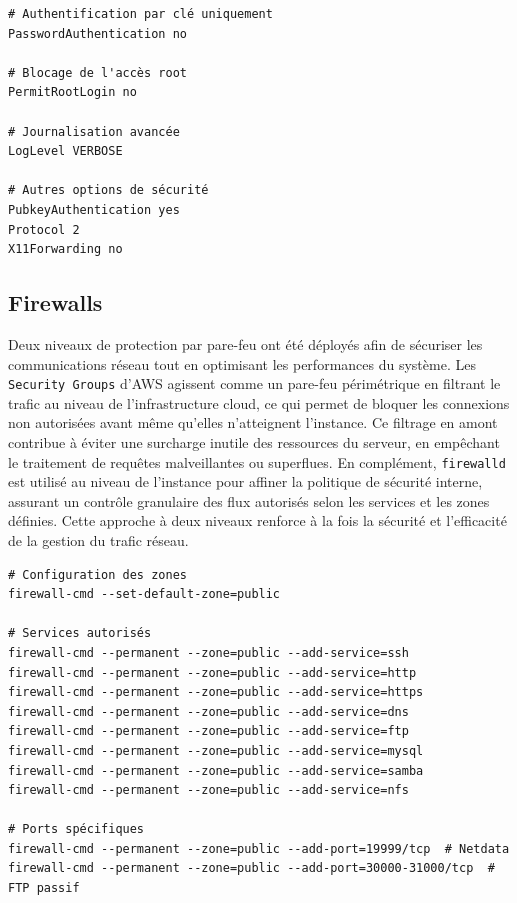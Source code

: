 \documentclass[a4paper,12pt]{article}
\begin{document}
\begin{lstlisting}[caption={Configuration SSH – /etc/ssh/sshd\textunderscore config}]
# Authentification par clé uniquement
PasswordAuthentication no

# Blocage de l'accès root
PermitRootLogin no

# Journalisation avancée
LogLevel VERBOSE

# Autres options de sécurité
PubkeyAuthentication yes
Protocol 2
X11Forwarding no
\end{lstlisting}

\subsection{Firewalls}

Deux niveaux de protection par pare-feu ont été déployés afin de sécuriser les communications réseau tout en optimisant les performances du système. Les  \texttt{Security Groups} d'AWS agissent comme un pare-feu périmétrique en filtrant le trafic au niveau de l'infrastructure cloud, ce qui permet de bloquer les connexions non autorisées avant même qu'elles n'atteignent l'instance. Ce filtrage en amont contribue à éviter une surcharge inutile des ressources du serveur, en empêchant le traitement de requêtes malveillantes ou superflues. En complément,  \texttt{firewalld} est utilisé au niveau de l'instance pour affiner la politique de sécurité interne, assurant un contrôle granulaire des flux autorisés selon les services et les zones définies. Cette approche à deux niveaux renforce à la fois la sécurité et l'efficacité de la gestion du trafic réseau.

\begin{lstlisting}[caption={Configuration Firewalld – Commandes de configuration}]
# Configuration des zones
firewall-cmd --set-default-zone=public

# Services autorisés
firewall-cmd --permanent --zone=public --add-service=ssh
firewall-cmd --permanent --zone=public --add-service=http
firewall-cmd --permanent --zone=public --add-service=https
firewall-cmd --permanent --zone=public --add-service=dns
firewall-cmd --permanent --zone=public --add-service=ftp
firewall-cmd --permanent --zone=public --add-service=mysql
firewall-cmd --permanent --zone=public --add-service=samba
firewall-cmd --permanent --zone=public --add-service=nfs

# Ports spécifiques
firewall-cmd --permanent --zone=public --add-port=19999/tcp  # Netdata
firewall-cmd --permanent --zone=public --add-port=30000-31000/tcp  # FTP passif
\end{lstlisting}
\end{document}
